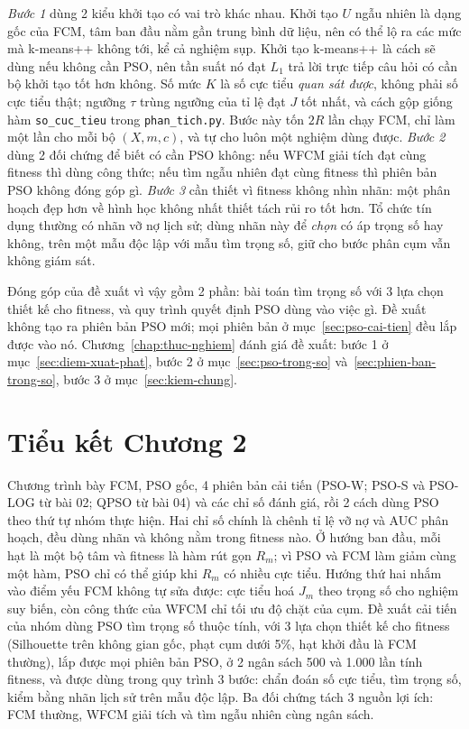 \emph{Bước 1} dùng 2 kiểu khởi tạo có vai trò khác nhau. Khởi tạo $U$ ngẫu nhiên là dạng gốc của FCM, tâm ban đầu nằm gần
trung bình dữ liệu, nên có thể lộ ra các mức mà k-means++ không tới, kể cả nghiệm sụp. Khởi tạo k-means++ là cách sẽ dùng nếu
không cần PSO, nên tần suất nó đạt $L_1$ trả lời trực tiếp câu hỏi có cần bộ khởi tạo tốt hơn không. Số mức $K$ là số cực
tiểu \emph{quan sát được}, không phải số cực tiểu thật; ngưỡng $\tau$ trùng ngưỡng của tỉ lệ đạt $J$ tốt nhất, và cách gộp
giống hàm \texttt{so\_cuc\_tieu} trong \texttt{phan\_tich.py}. Bước này tốn $2R$ lần chạy FCM, chỉ làm một lần cho mỗi bộ
$(X, m, c)$, và tự cho luôn một nghiệm dùng được. \emph{Bước 2} dùng 2 đối chứng để biết có cần PSO không: nếu WFCM giải
tích đạt cùng fitness thì dùng công thức; nếu tìm ngẫu nhiên đạt cùng fitness thì phiên bản PSO không đóng góp gì.
\emph{Bước 3} cần thiết vì fitness không nhìn nhãn: một phân hoạch đẹp hơn về hình học không nhất thiết tách rủi ro tốt hơn.
Tổ chức tín dụng thường có nhãn vỡ nợ lịch sử; dùng nhãn này để \emph{chọn} có áp trọng số hay không, trên một mẫu độc lập
với mẫu tìm trọng số, giữ cho bước phân cụm vẫn không giám sát.

Đóng góp của đề xuất vì vậy gồm 2 phần: bài toán tìm trọng số với 3 lựa chọn thiết kế cho fitness, và quy trình quyết định
PSO dùng vào việc gì. Đề xuất không tạo ra phiên bản PSO mới; mọi phiên bản ở mục~\ref{sec:pso-cai-tien} đều lắp được vào nó.
Chương~\ref{chap:thuc-nghiem} đánh giá đề xuất: bước 1 ở mục~\ref{sec:diem-xuat-phat}, bước 2 ở mục~\ref{sec:pso-trong-so}
và~\ref{sec:phien-ban-trong-so}, bước 3 ở mục~\ref{sec:kiem-chung}.

\section*{Tiểu kết Chương 2}

Chương trình bày FCM, PSO gốc, 4 phiên bản cải tiến (PSO-W; PSO-S và PSO-LOG từ bài 02; QPSO từ bài 04) và các chỉ số
đánh giá, rồi 2 cách dùng PSO theo thứ tự nhóm thực hiện. Hai chỉ số chính là chênh tỉ lệ vỡ nợ và AUC phân hoạch, đều dùng
nhãn và không nằm trong fitness nào. Ở hướng ban đầu, mỗi hạt là một bộ tâm và fitness là hàm rút gọn $R_m$; vì PSO và FCM làm giảm cùng một hàm, PSO chỉ
có thể giúp khi $R_m$ có nhiều cực tiểu. Hướng thứ hai nhắm vào điểm yếu FCM không tự sửa được: cực tiểu hoá $J_m$ theo trọng
số cho nghiệm suy biến, còn công thức của WFCM chỉ tối ưu độ chặt của cụm. Đề xuất cải tiến của nhóm dùng PSO tìm trọng số
thuộc tính, với 3 lựa chọn thiết kế cho fitness (Silhouette trên không gian gốc, phạt cụm dưới 5\%, hạt khởi đầu là FCM
thường), lắp được mọi phiên bản PSO, ở 2 ngân sách 500 và 1.000 lần tính fitness, và được dùng trong quy trình 3 bước:
chẩn đoán số cực tiểu, tìm trọng số, kiểm bằng nhãn lịch sử trên mẫu độc lập. Ba đối chứng tách 3 nguồn lợi ích: FCM thường,
WFCM giải tích và tìm ngẫu nhiên cùng ngân sách.
